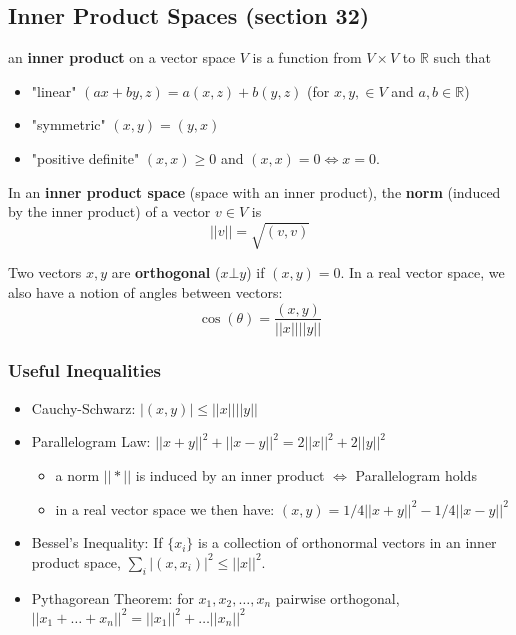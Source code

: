 \documentclass[a4paper, 12pt]{article}
\def\R{\ensuremath{\mathbb{R}}} %
\newcommand{\bt}[1]{\textbf{#1}} %
\begin{document}
\begin{multicols}{2}
\subsection{Inner Product Spaces (section 32)}
an \bt{inner product} on a vector space $V$ is a function from  $V \times  V$ to $\R$ such that
\begin{itemize}
    \item "linear" $(ax + by, z) = a(x, z) + b(y, z)$ (for $x,y, \in V$ and $a, b \in \R$)

    \item "symmetric" $(x, y) = (y, x)$
    \item "positive definite" $(x, x) \geq 0$ and $(x, x) = 0 \iff x = 0$.
\end{itemize}

In an \bt{inner product space} (space with an inner product), the \bt{norm} 
(induced by the inner product) of a vector $v \in V$ is 
$$|| v || = \sqrt{(v, v)}$$

Two vectors $x, y$ are \bt{orthogonal} ($x \bot y$) if $(x, y) = 0$.
In a real vector space, we also have a notion of angles between vectors: 
$$\cos(\theta) = \frac{(x, y)}{|| x || || y ||}$$

\subsubsection{Useful Inequalities}

\begin{itemize}
    \item Cauchy-Schwarz: $|(x, y)| \leq || x || || y ||$
    \item Parallelogram Law: $|| x + y ||^2 + || x - y||^2 = 2 || x ||^2 + 2 || y ||^2$
    \begin{itemize}
        \item a norm $|| * ||$ is induced by an inner product $\iff$ Parallelogram holds
        \item in a real vector space we then have: 
        $(x, y) = 1/4 || x + y ||^2 - 1/4 || x - y ||^2$
    \end{itemize}
    \item Bessel's Inequality: If $\{x_i\}$ is a collection of orthonormal vectors in an 
    inner product space, $\sum_i |(x, x_i)|^2 \leq || x ||^2$.
    \item Pythagorean Theorem: for $x_1, x_2, \dots, x_n$ pairwise orthogonal, 
    $||x_1 + \dots + x_n||^2 = ||x_1||^2 + \dots ||x_n||^2$
\end{itemize}



\end{multicols}
\end{document}
